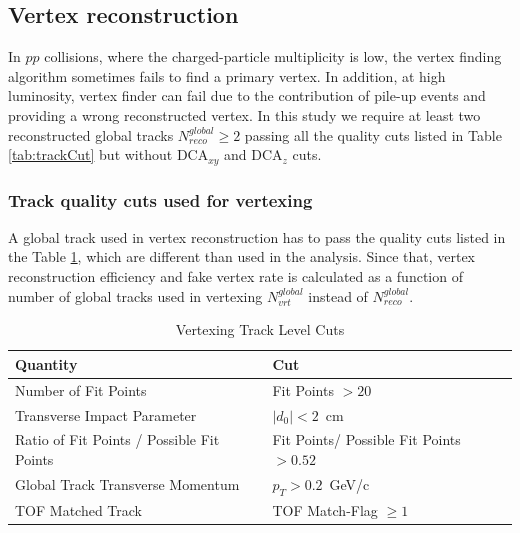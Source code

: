 \subsection{Vertex reconstruction}
In $pp$ collisions, where the charged-particle multiplicity is low, the vertex finding algorithm sometimes fails to find a primary vertex. In addition, at high luminosity, vertex finder can fail due to the contribution of pile-up events and providing a wrong reconstructed vertex. In this study we require at least two reconstructed global tracks $N^{global}_{reco}\geq 2$ passing all the quality cuts listed in Table \ref{tab:trackCut} but without $\textrm{DCA}_{xy}$ and $\textrm{DCA}_{z}$ cuts. 

\subsubsection{Track quality cuts used for vertexing}
A global track  used in vertex reconstruction has to pass the quality cuts listed in the Table \ref{tab:trackCutVertex}, which are different than used in the analysis. Since that, vertex reconstruction efficiency and fake vertex rate is calculated as a function of number of global tracks used in vertexing $N^{global}_{vrt}$ instead of $N^{global}_{reco}$. 


\begin{table}[H]
	\centering
	\begin{tabular}{| l | l |}
		\hline			
		Quantity & Cut \\
		\hline
		\hline
		Number of Fit Points & Fit Points $>20$\\
		Transverse Impact Parameter & $|d_0|<2$~cm\\ 
		Ratio of Fit Points / Possible Fit Points & Fit Points/ Possible Fit Points $>0.52$\\
		Global Track Transverse Momentum & $p_{T}>0.2$~GeV/c\\
		TOF Matched Track & TOF Match-Flag $\geq1$\\
		\hline  
	\end{tabular}
	\caption[Vertexing Track Level Cuts]{Vertexing Track Level Cuts}
	\label{tab:trackCutVertex}
\end{table}
